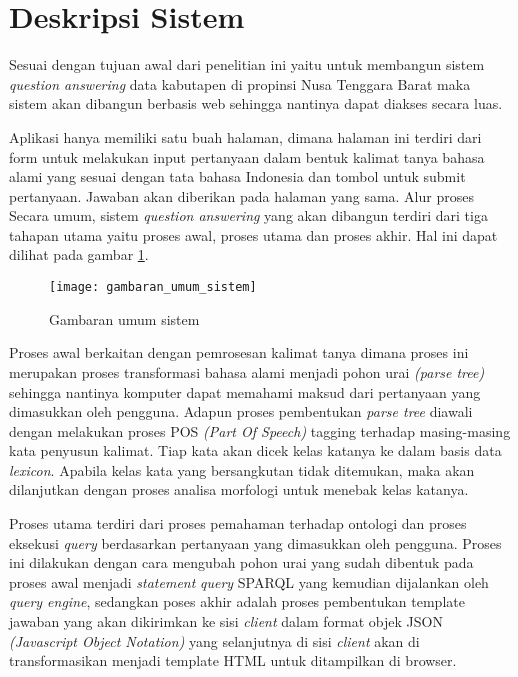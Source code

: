 \section{Deskripsi Sistem}
Sesuai dengan tujuan awal dari penelitian ini yaitu untuk membangun sistem \emph{question answering} data kabutapen di propinsi Nusa Tenggara Barat maka sistem akan dibangun berbasis web sehingga nantinya dapat diakses secara luas.

Aplikasi hanya memiliki satu buah halaman, dimana halaman ini terdiri dari form untuk melakukan input pertanyaan dalam bentuk kalimat tanya bahasa alami yang sesuai dengan tata bahasa Indonesia dan tombol untuk submit pertanyaan. Jawaban akan diberikan pada halaman yang sama. Alur proses Secara umum, sistem \emph{question answering} yang akan dibangun terdiri dari tiga tahapan utama yaitu proses awal, proses utama dan proses akhir. Hal ini dapat dilihat pada gambar \ref{fig:gambaran_umum_sistem}.

\begin{figure}[th]
	\centering
	\texttt{[image: gambaran\_umum\_sistem]}
	\caption{Gambaran umum sistem}
	\label{fig:gambaran_umum_sistem}
\end{figure}

Proses awal berkaitan dengan pemrosesan kalimat tanya dimana proses ini merupakan proses transformasi bahasa alami menjadi pohon urai \emph{(parse tree)} sehingga nantinya komputer dapat memahami maksud dari pertanyaan yang dimasukkan oleh pengguna. Adapun proses pembentukan \emph{parse tree} diawali dengan melakukan proses POS \emph{(Part Of Speech)} tagging terhadap masing-masing kata penyusun kalimat. Tiap kata akan dicek kelas katanya ke dalam basis data \emph{lexicon}. Apabila kelas kata yang bersangkutan tidak ditemukan, maka akan dilanjutkan dengan proses analisa morfologi untuk menebak kelas katanya.

Proses utama terdiri dari proses pemahaman terhadap ontologi dan proses eksekusi \emph{query} berdasarkan pertanyaan yang dimasukkan oleh pengguna. Proses ini dilakukan dengan cara mengubah pohon urai yang sudah dibentuk pada proses awal menjadi \emph{statement} \emph{query} SPARQL yang kemudian dijalankan oleh \emph{query engine}, sedangkan poses akhir adalah proses pembentukan template jawaban yang akan dikirimkan ke sisi \emph{client} dalam format objek JSON \emph{(Javascript Object Notation)} yang selanjutnya di sisi \emph{client} akan di transformasikan menjadi template HTML untuk ditampilkan di browser.